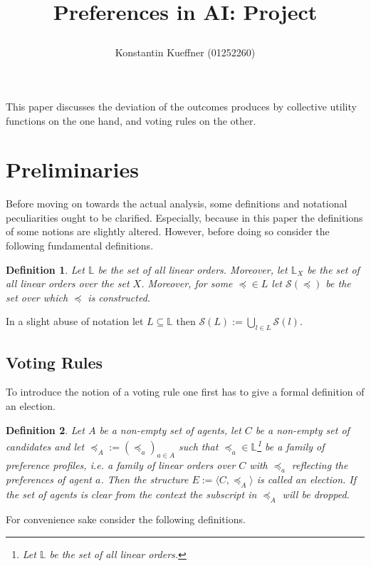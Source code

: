 \documentclass[11pt,a4paper]{article}
\title{Preferences in AI: Project\\
\author{Konstantin Kueffner (01252260)}}
\newtheorem{mydef}{Definition}
\newcommand{\pref}{\preceq}
\begin{document}
\maketitle

This paper discusses the deviation of the outcomes produces by collective utility functions on the one hand, and voting rules on the other.



\section{Preliminaries}
Before moving on towards the actual analysis, some definitions and notational peculiarities ought to be clarified. Especially, because in this paper the definitions of some notions are slightly altered. However, before doing so consider the following fundamental definitions.
\begin{mydef}
\label{def:election}
Let $\mathbb{L}$ be the set of all linear orders. Moreover, let $\mathbb{L}_X$ be the set of all linear orders over the set $X$. Moreover, for some $\preceq \in L$ let $\mathcal{S}(\preceq)$ be the set over which $\preceq$ is constructed.
\end{mydef} 
In a slight abuse of notation let $L \subseteq \mathbb{L}$ then $\mathcal{S}(L):= \bigcup_{l \in L} \mathcal{S}(l)$.

\subsection{Voting Rules}
To introduce the notion of a voting rule one first has to give  a formal definition of an election.
\begin{mydef}
\label{def:election}
Let $A$ be a non-empty set of \emph{agents}, let $C$ be a non-empty set of \emph{candidates} and let $\pref_A := (\pref_a)_{a \in A}$ such that $\pref_a \in \mathbb{L}$\footnote{Let $\mathbb{L}$ be the set of all linear orders.} be a family of preference profiles, i.e. a family of linear orders over $C$ with $\pref_a$ reflecting the preferences of agent $a$. Then the structure $E:=\langle C, \pref_A \rangle$ is called an \emph{election}. If the set of agents is clear from the context the subscript in $\pref_A$ will be dropped.
\end{mydef} 


For convenience sake consider the following definitions.


\end{document}
